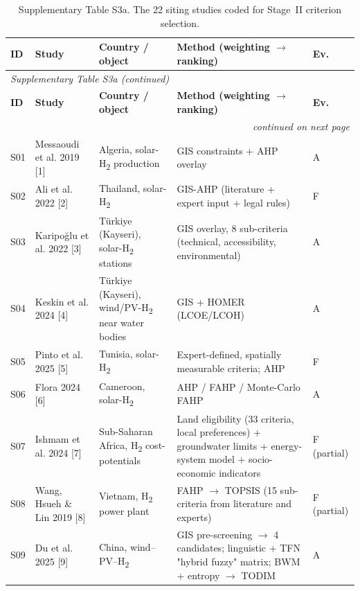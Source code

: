 \documentclass[11pt,a4paper]{article}
\begin{document}
{\footnotesize
\begin{longtable}{l>{\raggedright\arraybackslash}p{2.28cm}>{\raggedright\arraybackslash}p{2.84cm}>{\raggedright\arraybackslash}p{6.94cm}>{\raggedright\arraybackslash}p{1.51cm}}
\caption{Supplementary Table S3a. The 22 siting studies coded for Stage~II criterion selection.}\label{tab:s3a}\\
\toprule
\textbf{ID} & \textbf{Study} & \textbf{Country /\allowbreak{} object} & \textbf{Method (weighting $\rightarrow$ ranking)} & \textbf{Ev.} \\
\midrule
\endfirsthead
\multicolumn{5}{l}{\footnotesize\itshape Supplementary Table S3a (continued)}\\
\toprule
\textbf{ID} & \textbf{Study} & \textbf{Country /\allowbreak{} object} & \textbf{Method (weighting $\rightarrow$ ranking)} & \textbf{Ev.} \\
\midrule
\endhead
\midrule\multicolumn{5}{r}{\footnotesize\itshape continued on next page}\\
\endfoot
\bottomrule
\endlastfoot
S01 & Messaoudi et al. 2019 [1] & Algeria, solar-H\textsubscript{2} production & GIS constraints + AHP overlay & A \\
S02 & Ali et al. 2022 [2] & Thailand, solar-H\textsubscript{2} & GIS-AHP (literature + expert input + legal rules) & F \\
S03 & Karipoğlu et al. 2022 [3] & Türkiye (Kayseri), solar-H\textsubscript{2} stations & GIS overlay, 8 sub-criteria (technical, accessibility, environmental) & A \\
S04 & Keskin et al. 2024 [4] & Türkiye (Kayseri), wind/\allowbreak{}PV-H\textsubscript{2} near water bodies & GIS + HOMER (LCOE/\allowbreak{}LCOH) & A \\
S05 & Pinto et al. 2025 [5] & Tunisia, solar-H\textsubscript{2} & Expert-defined, spatially measurable criteria; AHP & F \\
S06 & Flora 2024 [6] & Cameroon, solar-H\textsubscript{2} & AHP /\allowbreak{} FAHP /\allowbreak{} Monte-Carlo FAHP & A \\
S07 & Ishmam et al. 2024 [7] & Sub-Saharan Africa, H\textsubscript{2} cost-potentials & Land eligibility (33 criteria, local preferences) + groundwater limits + energy-system model + socio-economic indicators & F (partial) \\
S08 & Wang, Hsueh \& Lin 2019 [8] & Vietnam, H\textsubscript{2} power plant & FAHP $\rightarrow$ TOPSIS (15 sub-criteria from literature and experts) & F (partial) \\
S09 & Du et al. 2025 [9] & China, wind--PV--H\textsubscript{2} & GIS pre-screening $\rightarrow$ 4 candidates; linguistic + TFN "hybrid fuzzy" matrix; BWM + entropy $\rightarrow$ TODIM & A \\

\end{longtable}}
\end{document}
